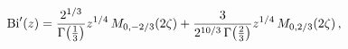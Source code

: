 \[\mathop{\mathrm{Bi}\/}\nolimits'\!\left(z\right)=\frac{2^{1/3}}{\mathop{\Gamma%
\/}\nolimits\!\left(\tfrac{1}{3}\right)}z^{1/4}\mathop{M_{0,-2/3}\/}\nolimits%
\!\left(2\zeta\right)+\frac{3}{2^{10/3}\mathop{\Gamma\/}\nolimits\!\left(%
\tfrac{2}{3}\right)}z^{1/4}\mathop{M_{0,2/3}\/}\nolimits\!\left(2\zeta\right),\]
